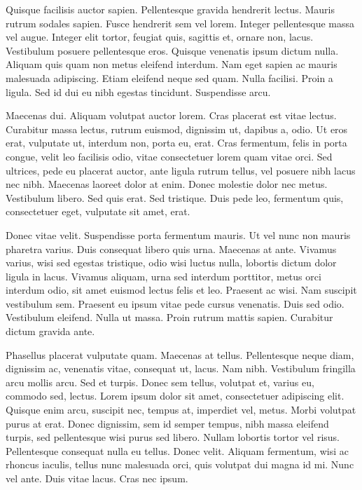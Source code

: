 \documentclass{article}
\begin{document}
Quisque facilisis auctor sapien. Pellentesque gravida hendrerit lectus.
Mauris rutrum sodales sapien. Fusce hendrerit sem vel lorem. Integer
pellentesque
massa vel augue. Integer elit tortor, feugiat quis, sagittis et, ornare non, lacus.
Vestibulum posuere pellentesque eros. Quisque venenatis ipsum dictum nulla.
Aliquam quis quam non metus eleifend interdum. Nam eget sapien ac mauris
malesuada adipiscing. Etiam eleifend neque sed quam. Nulla facilisi. Proin a
ligula. Sed id dui eu nibh egestas tincidunt. Suspendisse arcu.

Maecenas dui. Aliquam volutpat auctor lorem. Cras placerat est vitae lectus.
Curabitur massa lectus, rutrum euismod, dignissim ut, dapibus a, odio. Ut eros
erat, vulputate ut, interdum non, porta eu, erat. Cras fermentum, felis in
porta congue, velit leo facilisis odio, vitae consectetuer lorem quam vitae
orci. Sed ultrices, pede eu placerat auctor, ante ligula rutrum tellus, vel
posuere nibh lacus nec nibh. Maecenas laoreet dolor at enim. Donec molestie
dolor nec metus. Vestibulum libero. Sed quis erat. Sed tristique. Duis pede
leo, fermentum quis, consectetuer eget, vulputate sit amet, erat.

Donec vitae velit. Suspendisse porta fermentum mauris. Ut vel nunc non
mauris pharetra varius. Duis consequat libero quis urna. Maecenas at ante.
Vivamus varius, wisi sed egestas tristique, odio wisi luctus nulla, lobortis
dictum dolor ligula in lacus. Vivamus aliquam, urna sed interdum porttitor,
metus orci interdum odio, sit amet euismod lectus felis et leo. Praesent ac
wisi. Nam suscipit vestibulum sem. Praesent eu ipsum vitae pede cursus
venenatis. Duis sed odio. Vestibulum eleifend. Nulla ut massa. Proin rutrum
mattis sapien. Curabitur dictum gravida ante.

Phasellus placerat vulputate quam. Maecenas at tellus. Pellentesque neque
diam, dignissim ac, venenatis vitae, consequat ut, lacus. Nam nibh. Vestibulum
fringilla arcu mollis arcu. Sed et turpis. Donec sem tellus, volutpat et,
varius eu, commodo sed, lectus. Lorem ipsum dolor sit amet, consectetuer
adipiscing elit. Quisque enim arcu, suscipit nec, tempus at, imperdiet vel,
metus. Morbi volutpat purus at erat. Donec dignissim, sem id semper tempus,
nibh massa eleifend turpis, sed pellentesque wisi purus sed libero. Nullam
lobortis tortor vel risus. Pellentesque consequat nulla eu tellus. Donec velit.
Aliquam fermentum, wisi ac rhoncus iaculis, tellus nunc malesuada orci, quis
volutpat dui magna id mi. Nunc vel ante. Duis vitae lacus. Cras nec ipsum.
\end{document}
